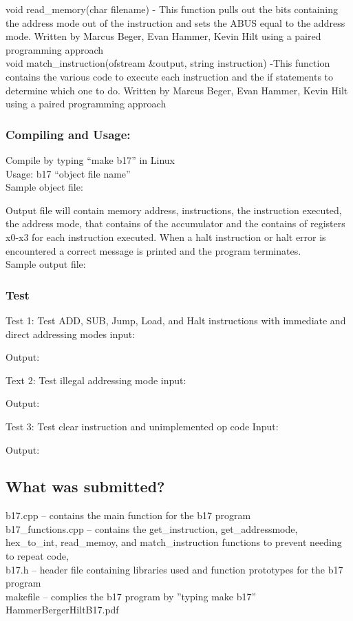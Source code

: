 \documentclass[11pt]{article}
\begin{document}
void read\_memory(char\* filename) - This function pulls out the bits containing the address mode out of the  instruction and sets the ABUS equal to the address mode. Written by Marcus Beger, Evan Hammer, Kevin Hilt using a paired programming approach\\

void match\_instruction(ofstream \&output, string instruction) -This function contains the various code to execute each instruction and the if statements to determine which one to do. Written by Marcus Beger, Evan Hammer, Kevin Hilt using a paired programming approach\\

\subsubsection{Compiling and Usage:}
Compile by typing “make b17” in Linux\\
Usage: b17 “object file name”\\
Sample object file:

Output file will contain memory address, instructions, the instruction executed, the address mode, that contains of the accumulator and the contains of registers x0-x3 for each instruction executed. When a halt instruction or halt error is encountered a correct message is printed and the program terminates. \\
Sample output file:


\subsubsection{Test}
Test 1: Test  ADD, SUB, Jump, Load, and Halt instructions with immediate and direct addressing modes
input:

Output:

Text 2: Test illegal addressing mode
input:

Output:

Test 3: Test clear instruction and unimplemented op code
Input:

Output:


\subsection{What was submitted?}
b17.cpp – contains the main function for the b17 program\\
b17\_functions.cpp – contains the get\_instruction, get\_addressmode, hex\_to\_int, read\_memoy, and match\_instruction functions to prevent needing to repeat code,\\
b17.h – header file containing libraries used and function prototypes for the b17 program\\
makefile – complies the b17 program by ''typing make b17''\\
HammerBergerHiltB17.pdf
\end{document}
